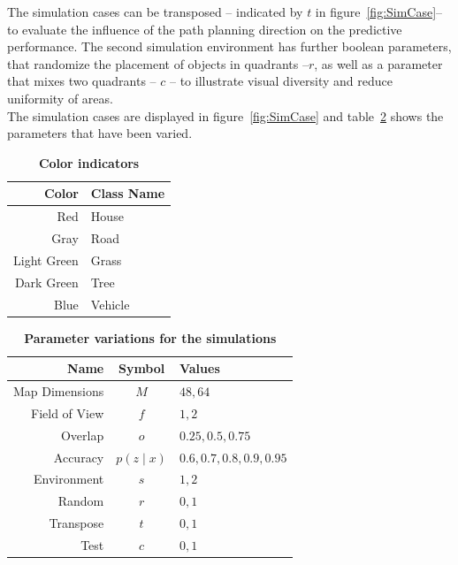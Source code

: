 \documentclass[twocolumn,letterpaper]{IEEEAerospaceCLS}  %
\begin{document}
The simulation cases can be transposed -- indicated by $t$ in figure~\ref{fig:SimCase}-- to evaluate the influence of the path planning direction on the predictive performance. The second simulation environment has further boolean parameters, that randomize the placement of objects in quadrants --$r$, as well as a parameter that mixes two quadrants -- $c$ -- to illustrate visual diversity and reduce uniformity of areas.\\
The simulation cases are displayed in figure~\ref{fig:SimCase} and table~\ref{tab:params} shows the parameters that have been varied.
\begin{table}[]
    \renewcommand{\arraystretch}{1.3}
    \caption{\bf Color indicators}
    \label{tab:colors}
    \centering
    \begin{tabular}{|r||l|}
        \hline
        \bfseries Color      & \bfseries Class Name    \\
        \hline \hline
        Red &  House\\
        \hline
        Gray  & Road         \\
        \hline
        Light Green     & Grass              \\
        \hline
        Dark Green & Tree           \\
        \hline
        Blue & Vehicle \\
        \hline
    \end{tabular}
\end{table}
\begin{table}[]
    \renewcommand{\arraystretch}{1.3}
    \caption{\bf Parameter variations for the simulations}
    \label{tab:params}
    \centering
    \begin{tabular}{|r||c|l|}
        \hline
        \bfseries Name      & \bfseries Symbol & \bfseries Values       \\
        \hline \hline
        Map Dimensions & $M$ & $48, 64$\\
        \hline
        Field of View  & $f$              & $1, 2$ \\
        \hline
        Overlap     & $o$              & $0.25, 0.5, 0.75$         \\
        \hline
        Accuracy & $p(z\mid x)$              & $0.6, 0.7, 0.8, 0.9, 0.95$        \\
        \hline
        Environment & $s$& $1, 2$ \\
        \hline
        Random & $r$ & $0, 1$ \\
        \hline
        Transpose & $t$ & $0, 1$  \\
        \hline
        Test & $c$ & $0, 1$  \\
        \hline
    \end{tabular}
\end{table}
\end{document}
